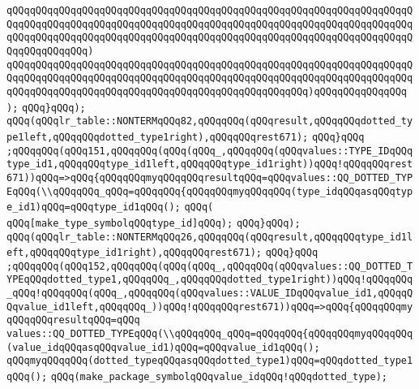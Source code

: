 \verb|qQQqqQQqqQQqqQQqqQQqqQQqqQQqqQQqqQQqqQQqqQQqqQQqqQQqqQQqqQQqqQQqqQQqqQQqqQQqqQQqqQQqqQQqqQQqqQQqqQQqqQQqqQQqqQQqqQQqqQQqqQQqqQQqqQQqqQQqqQQqqQQqqQQqqQQqqQQqqQQqqQQqqQQqqQQqqQQqqQQqqQQqqQQqqQQqqQQqqQQqqQQqqQQqqQQqqQQqqQQqqQQq)|\newline
\verb|qQQqqQQqqQQqqQQqqQQqqQQqqQQqqQQqqQQqqQQqqQQqqQQqqQQqqQQqqQQqqQQqqQQqqQQqqQQqqQQqqQQqqQQqqQQqqQQqqQQqqQQqqQQqqQQqqQQqqQQqqQQqqQQqqQQqqQQqqQQqqQQqqQQqqQQqqQQqqQQqqQQqqQQqqQQqqQQqqQQqqQQqqQQqqQQq)qQQqqQQqqQQqqQQq|\newline
\verb|);|\newline
\verb|qQQq}qQQq);|\newline
\verb|qQQq(qQQqlr_table::NONTERMqQQq82,qQQqqQQq(qQQqresult,qQQqqQQqdotted_type1left,qQQqqQQqdotted_type1right),qQQqqQQqrest671);|\newline
\verb|qQQq}qQQq|\newline
\verb|;qQQqqQQq(qQQq151,qQQqqQQq(qQQq(qQQq_,qQQqqQQq(qQQqvalues::TYPE_IDqQQqtype_id1,qQQqqQQqtype_id1left,qQQqqQQqtype_id1right))qQQq!qQQqqQQqrest671))qQQq=>qQQq{qQQqqQQqmyqQQqqQQqresultqQQq=qQQqvalues::QQ_DOTTED_TYPEqQQq(\\qQQqqQQq_qQQq=qQQqqQQq{qQQqqQQqmyqQQqqQQq(type_idqQQqasqQQqtype_id1)qQQq=qQQqtype_id1qQQq();|\newline
\verb|qQQq(|\newline
\verb|qQQq[make_type_symbolqQQqtype_id]qQQq);|\newline
\verb|qQQq}qQQq);|\newline
\verb|qQQq(qQQqlr_table::NONTERMqQQq26,qQQqqQQq(qQQqresult,qQQqqQQqtype_id1left,qQQqqQQqtype_id1right),qQQqqQQqrest671);|\newline
\verb|qQQq}qQQq|\newline
\verb|;qQQqqQQq(qQQq152,qQQqqQQq(qQQq(qQQq_,qQQqqQQq(qQQqvalues::QQ_DOTTED_TYPEqQQqdotted_type1,qQQqqQQq_,qQQqqQQqdotted_type1right))qQQq!qQQqqQQq_qQQq!qQQqqQQq(qQQq_,qQQqqQQq(qQQqvalues::VALUE_IDqQQqvalue_id1,qQQqqQQqvalue_id1left,qQQqqQQq_))qQQq!qQQqqQQqrest671))qQQq=>qQQq{qQQqqQQqmyqQQqqQQqresultqQQq=qQQq|\newline
\verb|values::QQ_DOTTED_TYPEqQQq(\\qQQqqQQq_qQQq=qQQqqQQq{qQQqqQQqmyqQQqqQQq(value_idqQQqasqQQqvalue_id1)qQQq=qQQqvalue_id1qQQq();|\newline
\verb|qQQqmyqQQqqQQq(dotted_typeqQQqasqQQqdotted_type1)qQQq=qQQqdotted_type1qQQq();|\newline
\verb|qQQq(make_package_symbolqQQqvalue_idqQQq!qQQqdotted_type);|\newline
